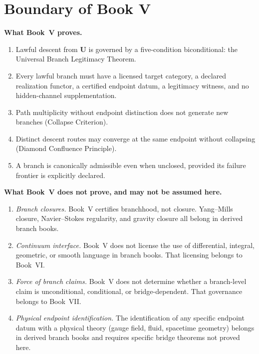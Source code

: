 \documentclass[12pt,oneside]{amsbook}
\theoremstyle{plain}
\theoremstyle{definition}
\theoremstyle{remark}
\begin{document}
\section{Boundary of Book V}

\textbf{What Book~V proves.}
\begin{enumerate}
  \item Lawful descent from $\mathbf{U}$ is governed by a five-condition
        biconditional: the Universal Branch Legitimacy Theorem.
  \item Every lawful branch must have a licensed target category,
        a declared realization functor, a certified endpoint datum, a
        legitimacy witness, and no hidden-channel supplementation.
  \item Path multiplicity without endpoint distinction does not
        generate new branches (Collapse Criterion).
  \item Distinct descent routes may converge at the same endpoint
        without collapsing (Diamond Confluence Principle).
  \item A branch is canonically admissible even when unclosed,
        provided its failure frontier is explicitly declared.
\end{enumerate}

\textbf{What Book~V does not prove, and may not be assumed here.}
\begin{enumerate}
  \item \emph{Branch closures.}  Book~V certifies branchhood, not
        closure.  Yang--Mills closure, Navier--Stokes regularity, and
        gravity closure all belong in derived branch books.
  \item \emph{Continuum interface.}  Book~V does not license the use
        of differential, integral, geometric, or smooth language in
        branch books.  That licensing belongs to Book~VI.
  \item \emph{Force of branch claims.}  Book~V does not determine
        whether a branch-level claim is unconditional, conditional, or
        bridge-dependent.  That governance belongs to Book~VII.
  \item \emph{Physical endpoint identification.}  The identification
        of any specific endpoint datum with a physical theory (gauge
        field, fluid, spacetime geometry) belongs in derived branch
        books and requires specific bridge theorems not proved here.
\end{enumerate}
\end{document}
